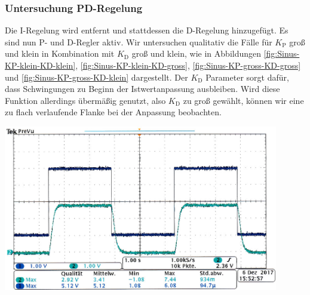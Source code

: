 \subsubsection*{Untersuchung PD-Regelung}
%
Die I-Regelung wird entfernt und stattdessen die D-Regelung hinzugefügt.
Es sind nun P- und D-Regler aktiv.
Wir untersuchen qualitativ die Fälle für $K_{\text{P}}$ groß und klein in Kombination mit $K_{\text{D}}$ groß und klein, wie in Abbildungen \ref{fig:Sinus-KP-klein-KD-klein}, \ref{fig:Sinus-KP-klein-KD-gross}, \ref{fig:Sinus-KP-gross-KD-gross} und \ref{fig:Sinus-KP-gross-KD-klein} dargestellt.
Der $K_{\text{D}}$ Parameter sorgt dafür, dass Schwingungen zu Beginn der Istwertanpassung ausbleiben.
Wird diese Funktion allerdings übermäßig genutzt, also $K_{\text{D}}$ zu groß gewählt, können wir eine zu flach verlaufende Flanke bei der Anpassung beobachten.
%
\par
%
\minipage{\linewidth}
    \begin{center}
        \captionsetup{type=figure}
        \begin{adjustbox}{max width=\linewidth, keepaspectratio}
            \includegraphics[width=120mm]{jpg/Sinus-KP-klein-KD-klein}
        \end{adjustbox}
        \label{fig:Sinus-KP-klein-KD-klein}
    \end{center}
\endminipage
%
\par
%
\minipage{\linewidth}
